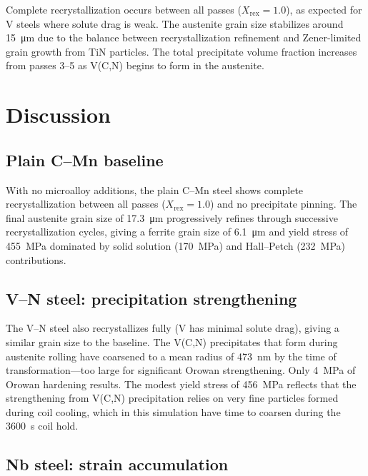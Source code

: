 \documentclass[11pt,a4paper]{article}
\newcommand{\Xrex}{\ensuremath{X_\mathrm{rex}}}
\begin{document}
Complete recrystallization occurs between all passes ($\Xrex = 1.0$), as
expected for V steels where solute drag is weak.  The austenite grain size
stabilizes around \SI{15}{\micro\metre} due to the balance between
recrystallization refinement and Zener-limited grain growth from TiN particles.
The total precipitate volume fraction increases from passes 3--5 as V(C,N)
begins to form in the austenite.

\section{Discussion}
\label{sec:discussion}

\subsection{Plain C--Mn baseline}

With no microalloy additions, the plain C--Mn steel shows complete
recrystallization between all passes ($\Xrex = 1.0$) and no precipitate
pinning.  The final austenite grain size of \SI{17.3}{\micro\metre}
progressively refines through successive recrystallization cycles, giving a
ferrite grain size of \SI{6.1}{\micro\metre} and yield stress of
\SI{455}{\mega\pascal} dominated by solid solution (\SI{170}{\mega\pascal})
and Hall--Petch (\SI{232}{\mega\pascal}) contributions.

\subsection{V--N steel: precipitation strengthening}

The V--N steel also recrystallizes fully (V has minimal solute drag), giving a
similar grain size to the baseline.  The V(C,N) precipitates that form during
austenite rolling have coarsened to a mean radius of \SI{473}{\nano\metre} by
the time of transformation---too large for significant Orowan strengthening.
Only \SI{4}{\mega\pascal} of Orowan hardening results.  The modest yield stress
of \SI{456}{\mega\pascal} reflects that the strengthening from V(C,N)
precipitation relies on very fine particles formed during coil cooling, which in
this simulation have time to coarsen during the \SI{3600}{\second} coil hold.

\subsection{Nb steel: strain accumulation}
\end{document}
